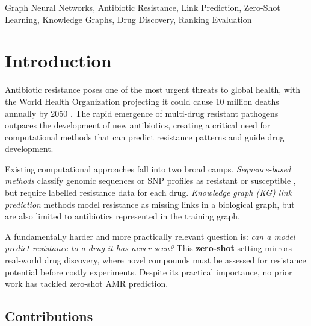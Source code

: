 \documentclass[conference]{IEEEtran}
\begin{document}
\begin{IEEEkeywords}
Graph Neural Networks, Antibiotic Resistance, Link Prediction, Zero-Shot Learning, Knowledge Graphs, Drug Discovery, Ranking Evaluation
\end{IEEEkeywords}

\section{Introduction}

Antibiotic resistance poses one of the most urgent threats to global health, with the World Health Organization projecting it could cause 10 million deaths annually by 2050 \cite{who2019}. The rapid emergence of multi-drug resistant pathogens outpaces the development of new antibiotics, creating a critical need for computational methods that can predict resistance patterns and guide drug development.

Existing computational approaches fall into two broad camps. \textit{Sequence-based methods} classify genomic sequences or SNP profiles as resistant or susceptible \cite{yang2020machine, davis2016antimicrobial}, but require labelled resistance data for each drug. \textit{Knowledge graph (KG) link prediction} methods \cite{youn2022kids, bessadok2026bridge} model resistance as missing links in a biological graph, but are also limited to antibiotics represented in the training graph.

A fundamentally harder and more practically relevant question is: \textit{can a model predict resistance to a drug it has never seen?} This \textbf{zero-shot} setting mirrors real-world drug discovery, where novel compounds must be assessed for resistance potential before costly experiments. Despite its practical importance, no prior work has tackled zero-shot AMR prediction.

\subsection{Contributions}
\end{document}
